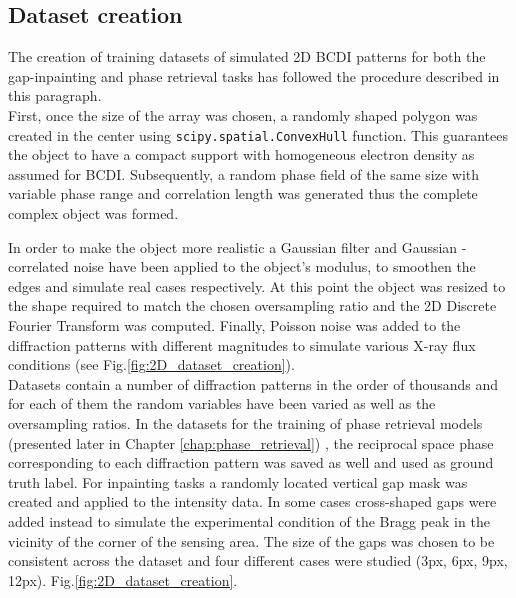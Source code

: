 \subsection{Dataset creation}\label{sec:dataset_creation2D}

The creation of training datasets of simulated 2D BCDI patterns for both the gap-inpainting and phase retrieval tasks has followed the procedure
described in this paragraph.\\
First, once the size of the array was chosen, a randomly shaped polygon was created in the center using 
\texttt{scipy.spatial.ConvexHull} function. This guarantees the object to have a compact support with homogeneous electron 
density as assumed for BCDI. Subsequently, a random phase field of the same size with variable phase range and correlation 
length was generated thus the complete complex object was formed.

In order to make the object more realistic a Gaussian filter and Gaussian - correlated noise \cite{Gaussian_noise1984} 
have been applied to the 
object's modulus, to smoothen the edges and simulate real cases respectively. At this point the object was resized 
to the shape required to match the chosen oversampling ratio and the 2D Discrete Fourier Transform was computed. Finally, 
Poisson noise was added to the diffraction patterns with different magnitudes to simulate 
various X-ray flux conditions (see Fig.\ref{fig:2D_dataset_creation}). \\
Datasets contain a number of diffraction patterns in the order of thousands and for each of them the random variables 
have been varied as well as the oversampling ratios. In the datasets for the training of phase retrieval models (presented 
later in Chapter \ref{chap:phase_retrieval}) , 
the reciprocal space phase corresponding to each diffraction pattern was saved as well and used as ground truth label. 
For inpainting tasks a randomly located vertical gap mask was created and applied to the intensity data. In some cases 
cross-shaped gaps were added instead to simulate the experimental condition of the Bragg peak in the vicinity of the 
corner of the sensing area. The size of the gaps was chosen to be consistent across the dataset and four different 
cases were studied (3px, 6px, 9px, 12px). Fig.\ref{fig:2D_dataset_creation}. 

